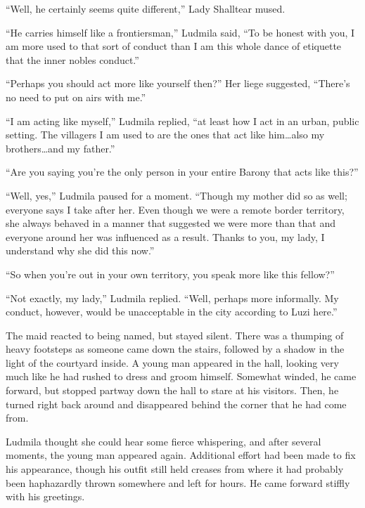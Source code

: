  

“Well, he certainly seems quite different,” Lady Shalltear mused.

 

“He carries himself like a frontiersman,” Ludmila said, “To be honest with you, I am more used to that sort of conduct than I am this whole dance of etiquette that the inner nobles conduct.”

 

“Perhaps you should act more like yourself then?” Her liege suggested, “There’s no need to put on airs with me.”

 

“I am acting like myself,” Ludmila replied, “at least how I act in an urban, public setting. The villagers I am used to are the ones that act like him…also my brothers…and my father.”

 

“Are you saying you’re the only person in your entire Barony that acts like this?”

 

“Well, yes,” Ludmila paused for a moment. “Though my mother did so as well; everyone says I take after her. Even though we were a remote border territory, she always behaved in a manner that suggested we were more than that and everyone around her was influenced as a result. Thanks to you, my lady, I understand why she did this now.”

 

“So when you’re out in your own territory, you speak more like this fellow?”

 

“Not exactly, my lady,” Ludmila replied. “Well, perhaps more informally. My conduct, however, would be unacceptable in the city according to Luzi here.”

 

The maid reacted to being named, but stayed silent. There was a thumping of heavy footsteps as someone came down the stairs, followed by a shadow in the light of the courtyard inside. A young man appeared in the hall, looking very much like he had rushed to dress and groom himself. Somewhat winded, he came forward, but stopped partway down the hall to stare at his visitors. Then, he turned right back around and disappeared behind the corner that he had come from.

 

Ludmila thought she could hear some fierce whispering, and after several moments, the young man appeared again. Additional effort had been made to fix his appearance, though his outfit still held creases from where it had probably been haphazardly thrown somewhere and left for hours. He came forward stiffly with his greetings.

